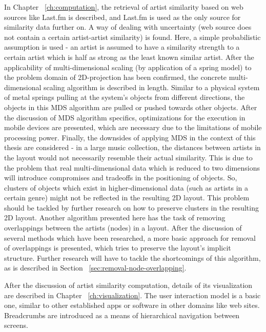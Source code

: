 In Chapter ~\ref{ch:computation}, the retrieval of artist similarity based on web sources like Last.fm is described, and Last.fm is used as the only source for similarity data further on. A way of dealing with uncertainty (web source does not contain a certain artist-artist similarity) is found. Here, a simple probabilistic assumption is used - an artist is assumed to have a similarity strength to a certain artist which is half as strong as the least known similar artist. After the applicability of multi-dimensional scaling (by application of a spring model) to the problem domain of 2D-projection has been confirmed, the concrete multi-dimensional scaling algorithm is described in length. Similar to a physical system of metal springs pulling at the system's objects from different directions, the objects in this MDS algorithm are pulled or pushed towards other objects. After the discussion of MDS algorithm specifics, optimizations for the execution in mobile devices are presented, which are necessary due to the limitations of mobile processing power. Finally, the downsides of applying MDS in the context of this thesis are considered - in a large music collection, the distances between artists in the layout would not necessarily resemble their actual similarity. This is due to the problem that real multi-dimensional data which is reduced to two dimensions will introduce compromises and tradeoffs in the positioning of objects. So, clusters of objects which exist in higher-dimensional data (such as artists in a certain genre) might not be reflected in the resulting 2D layout. This problem should be tackled by further research on how to preserve clusters in the resulting 2D layout.
Another algorithm presented here has the task of removing overlappings between the artists (nodes) in a layout. After the discussion of several methods which have been researched, a more basic approach for removal of overlappings is presented, which tries to preserve the layout's implicit structure. Further research will have to tackle the shortcomings of this algorithm, as is described in Section ~\ref{sec:removal-node-overlapping}.

After the discussion of artist similarity computation, details of its visualization are described in Chapter ~\ref{ch:visualization}. The user interaction model is a basic one, similar to other established apps or software in other domains like web sites. Breadcrumbs are introduced as a means of hierarchical navigation between screens.


